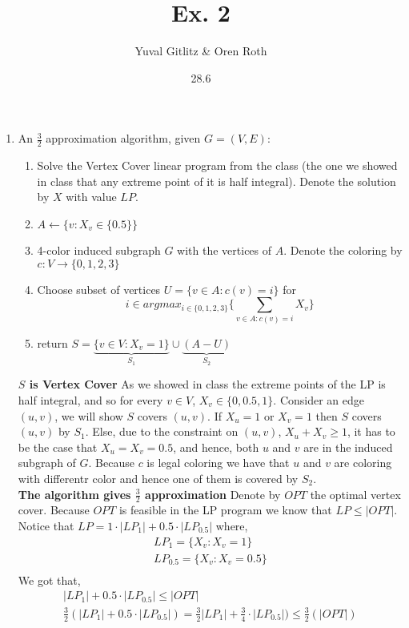 \documentclass{article}
\title{Ex. 2}
\author{Yuval Gitlitz \& Oren Roth}
\date{28.6}
\begin{document}
\maketitle

\begin{enumerate}
\item 
An $\frac{3}{2}$ approximation algorithm, given $G=(V,E)$:
\begin{enumerate}

\item Solve the Vertex Cover linear program from the class (the one we showed in class that any extreme point of it is half integral). Denote the solution by $X$ with value $LP$.
\item $A \leftarrow \{v : X_v\in \{0.5\}\}$
\item 4-color induced subgraph $G$ with the vertices of $A$. Denote the coloring by $c: V \rightarrow \{0,1,2,3\}$
\item Choose subset of vertices 
$U =  \{ v\in A: c(v) = i\}$ for 
$$i \in argmax_{i \in \{0,1,2,3\}} \{ \sum_{ v\in A: c(v) = i}  X_v  \}$$
\item return $S = \underbrace{\{v\in V: X_v=1\}}_{S_1} \cup \underbrace{ (A-U)}_{S_2}$
\end{enumerate}
\textbf{$S$ is Vertex Cover}
As we showed in class the extreme points of the LP is half integral, and so for every $v\in V$, $X_v\in \{0,0.5,1\}$. Consider an edge $(u,v)$, we will show $S$ covers $(u,v)$. If $X_u=1$ or $X_v=1$  then $S$ covers $(u,v)$ by $S_1$. Else, due to the constraint on $(u,v)$, $X_u+X_v\ge 1$, it has to be the case that $X_u=X_v=0.5$, and hence, both $u$ and $v$ are in the induced subgraph of $G$. Because $c$ is legal coloring we have that $u$ and $v$ are coloring with differentr color and hence one of them is covered by $S_2$.
\\
\textbf{The algorithm gives $\frac{3}{2}$ approximation}
Denote by $OPT$ the optimal vertex cover. Because $OPT$ is feasible in the LP program we know that $LP\le |OPT|$. Notice that $LP= 1\cdot |LP_1| + 0.5\cdot |LP_{0.5}|$ where,
\begin{align*}
LP_1 = \{X_v : X_v=1\}\\
LP_{0.5} =  \{X_v : X_v=0.5\}\\
\end{align*}
We got that,
\begin{align*}
|LP_1| + 0.5\cdot |LP_{0.5}| \le |OPT|\\
\frac{3}{2}(|LP_1| + 0.5\cdot |LP_{0.5}|)  = \frac{3}{2}|LP_1| + \frac{3}{4}\cdot |LP_{0.5}|) \le \frac{3}{2}(|OPT|)
\end{align*}


\end{enumerate}
\end{document}
